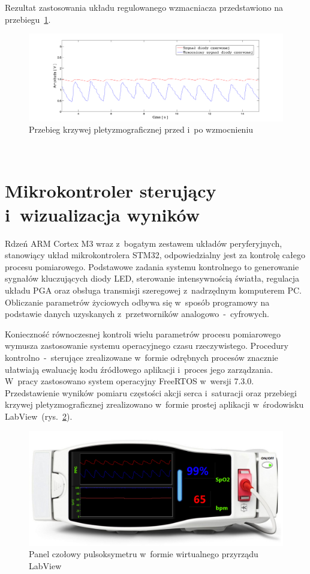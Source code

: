 Rezultat zastosowania układu regulowanego wzmacniacza przedstawiono na przebiegu~\ref{rys:wzm}.
\begin{figure}[!h]
	\centerline{\includegraphics[scale = 0.42]{graphic/wzm}}
	\caption{Przebieg krzywej pletyzmograficznej przed i~po wzmocnieniu}
	\label{rys:wzm}
\end{figure}\\

\section{Mikrokontroler sterujący i~wizualizacja wyników}
\label{sec:ARM}

Rdzeń ARM Cortex M3 wraz z~bogatym zestawem układów peryferyjnych, stanowiący układ mikrokontrolera STM32, odpowiedzialny
jest za kontrolę całego procesu pomiarowego. Podstawowe zadania systemu kontrolnego to generowanie sygnałów kluczujących diody LED, 
sterowanie intensywnością światła, regulacja układu PGA oraz obsługa transmisji szeregowej z~nadrzędnym komputerem PC. 
Obliczanie parametrów życiowych odbywa się w~sposób programowy na podstawie danych uzyskanych z~przetworników analogowo~-~cyfrowych.

Konieczność równoczesnej kontroli wielu parametrów procesu pomiarowego wymusza zastosowanie systemu operacyjnego czasu
rzeczywistego. Procedury kontrolno~-~sterujące zrealizowane w~formie odrębnych procesów znacznie ułatwiają ewaluację
kodu źródłowego aplikacji i~proces jego zarządzania. W~pracy zastosowano system operacyjny FreeRTOS w~wersji 7.3.0.\\

Przedstawienie wyników pomiaru częstości akcji serca i~saturacji oraz przebiegi krzywej pletyzmograficznej zrealizowano w~formie
prostej aplikacji w~środowisku LabView~(rys.~\ref{rys:GUI}).\\ 
\begin{figure}[ht]
	\centerline{\includegraphics[scale = 0.55]{graphic/GUI}}
	\caption{Panel czołowy pulsoksymetru w~formie wirtualnego przyrządu LabView}
	\label{rys:GUI}
\end{figure}

